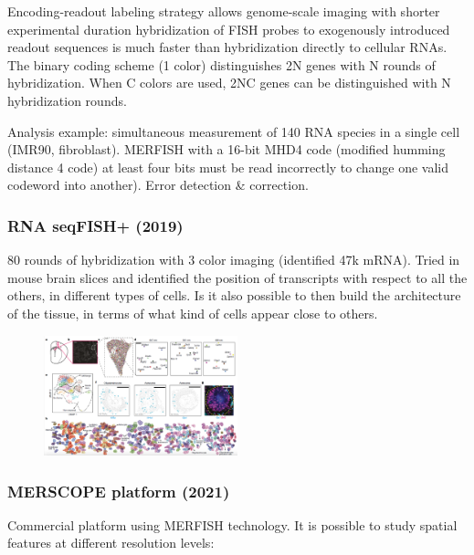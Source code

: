 Encoding-readout labeling strategy allows genome-scale imaging with
shorter experimental duration hybridization of FISH probes to
exogenously introduced readout sequences is much faster than
hybridization directly to cellular RNAs. The binary coding scheme (1
color) distinguishes 2N genes with N rounds of hybridization. When C
colors are used, 2NC genes can be distinguished with N hybridization
rounds.

Analysis example: simultaneous measurement of 140 RNA species in a
single cell (IMR90, fibroblast). MERFISH with a 16-bit MHD4 code
(modified humming distance 4 code) at least four bits must be read
incorrectly to change one valid codeword into another). Error detection
\& correction.

\hypertarget{rna-seqfish-2019}{%
\subsubsection{\texorpdfstring{\textbf{RNA seqFISH+
(2019)}}{RNA seqFISH+ (2019)}}\label{rna-seqfish-2019}}

80 rounds of hybridization with 3 color imaging (identified 47k mRNA).
Tried in mouse brain slices and identified the position of transcripts
with respect to all the others, in different types of cells. Is it also
possible to then build the architecture of the tissue, in terms of what
kind of cells appear close to others.

\begin{figure}
\centering
\includegraphics[width=0.5\textwidth]{images/Screenshot_7.png}
\caption{}
\end{figure}

\hypertarget{merscope-platform-2021}{%
\subsubsection{MERSCOPE platform (2021)}\label{merscope-platform-2021}}

Commercial platform using MERFISH technology. It is possible to study
spatial features at different resolution levels:

